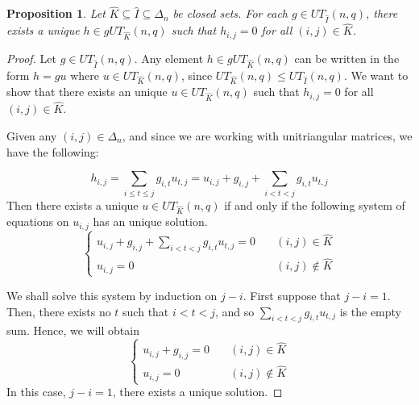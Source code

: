 \documentclass[11pt,letterpaper]{amsart}
\newtheorem{proposition}[theorem]{Proposition}
\begin{document}
\begin{proposition}\label{prop:Cosets_representative}
    Let $\widehat{K}\subseteq \widehat{I}\subseteq \Delta_n$ be closed sets. For each $g\in UT_{\widehat{I}}(n,q)$, there exists a unique $h\in g UT_{\widehat{K}}(n,q)$ such that $h_{i,j}=0$ for all $(i,j)\in \widehat{K}$.
\end{proposition}
\begin{proof}
    Let $g\in UT_{\widehat{I}}(n,q)$. Any element $h\in gUT_{\widehat{K}}(n,q)$ can be written in the form $h=gu$ where $u\in UT_{\widehat{K}}(n,q)$, since $UT_{\widehat{K}}(n,q) \leq UT_{\widehat{I}}(n,q)$. 
    We want to show that there exists an unique $u\in UT_{\widehat{K}}(n,q)$ such that $h_{i,j}=0$ for all $(i,j)\in \widehat{K}$.

    Given any $(i,j)\in \Delta_n$, and since we are working with unitriangular matrices, we have the following:

    $$
    h_{i,j}=\sum_{i\leq t\leq j} g_{i,t}u_{t,j}=u_{i,j}+g_{i,j} +\sum_{i<t<j} g_{i,t}u_{t,j}
    $$
    Then there exists a unique $u\in UT_{\widehat{K}}(n,q)$ if and only if the following system of equations on $u_{i,j}$ has an unique solution.
    $$
    \begin{cases}
        u_{i,j}+g_{i,j} +\sum_{i<t<j} g_{i,t}u_{t,j}=0\quad &(i,j)\in \widehat{K}\\
        u_{i,j}=0 \quad &(i,j)\notin \widehat{K}
    \end{cases}
    $$
    
    We shall solve this system by induction on $j-i$.
    First suppose that $j-i=1$. Then, there exists no $t$ such that $i<t<j$, and so $\sum_{i<t<j}g_{i,t}u_{t,j}$ is the empty sum. Hence, we will obtain
        $$
    \begin{cases}
        u_{i,j}+g_{i,j}=0\quad &(i,j)\in \widehat{K}\\
        u_{i,j}=0 \quad &(i,j)\notin \widehat{K}
    \end{cases}
    $$
    In this case, $j-i=1$, there exists a unique solution.  


\end{proof}
\end{document}
